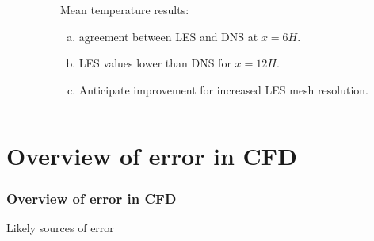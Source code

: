 \documentclass{beamer}
\begin{document}
\begin{frame}
\begin{minipage}[0.5\textheight]{\textwidth}
\begin{columns}[T]
\begin{column}{0.7\textwidth}
\end{column}
\hspace{-30pt}
\begin{column}{0.5\textwidth}
\vspace{20pt}
\tiny
Mean temperature results:
\begin{enumerate}[(a)]
\item agreement between LES and DNS at $x = 6H$. 
\item LES values lower than DNS for $x = 12H$. 
\item Anticipate improvement for increased LES mesh resolution.
\end{enumerate}

\end{column}
\end{columns}
\end{minipage}

\end{frame}


\section[Error]{Overview of error in CFD}
\begin{frame}%
\frametitle{Overview of error in CFD}
\vspace{0pt}
\begin{minipage}[t][1.1\textheight]{1\textwidth}
\scriptsize
\vspace{-20pt}
\begin{exampleblock}{Likely sources of error}
\vspace{-20pt}
\begin{figure}[h!]
\end{figure}
\end{exampleblock}
\end{minipage}
\end{frame}
\end{document}

